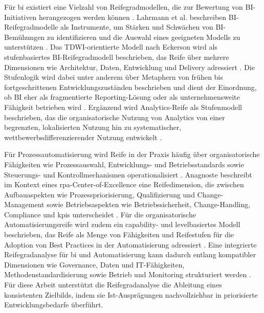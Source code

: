 Für \gls{bi} existiert eine Vielzahl von Reifegradmodellen, die zur Bewertung von BI-Initiativen herangezogen werden können \cite{LahrmannEtAl2010BIMMsOverview}. 
Lahrmann et al. beschreiben BI-Reifegradmodelle als Instrumente, um Stärken und Schwächen von BI-Bemühungen zu identifizieren und die Auswahl eines geeigneten Modells zu unterstützen \cite{LahrmannEtAl2010BIMMsOverview}. 
Das TDWI-orientierte Modell nach Eckerson wird als stufenbasiertes BI-Reifegradmodell beschrieben, das Reife über mehrere Dimensionen wie Architektur, Daten, Entwicklung und Delivery adressiert \cite{HribarRajteric2010BIMMsOverview,LahrmannEtAl2010BIMMsOverview}. 
Die Stufenlogik wird dabei unter anderem über Metaphern von frühen bis fortgeschrittenen Entwicklungszuständen beschrieben und dient der Einordnung, ob BI eher als fragmentierte Reporting-Lösung oder als unternehmensweite Fähigkeit betrieben wird \cite{HribarRajteric2010BIMMsOverview}. 
Ergänzend wird Analytics-Reife als Stufenmodell beschrieben, das die organisatorische Nutzung von Analytics von einer begrenzten, lokalisierten Nutzung hin zu systematischer, wettbewerbsdifferenzierender Nutzung entwickelt \cite{DavenportHarris2017CompetingOnAnalytics}. 

Für Prozessautomatisierung wird Reife in der Praxis häufig über organisatorische Fähigkeiten wie Prozessauswahl, Entwicklungs- und Betriebsstandards sowie Steuerungs- und Kontrollmechanismen operationalisiert \cite{Anagnoste2013RPACoE,RoeglingerPoeppelbuSS2011}. 
Anagnoste beschreibt im Kontext eines \gls{rpa}-Center-of-Excellence eine Reifedimension, die zwischen Aufbauaspekten wie Prozesspriorisierung, Qualifizierung und Change-Management sowie Betriebsaspekten wie Betriebssicherheit, Change-Handling, Compliance und \glspl{kpi} unterscheidet \cite{Anagnoste2013RPACoE}. 
Für die organisatorische Automatisierungsreife wird zudem ein capability- und levelbasiertes Modell beschrieben, das Reife als Menge von Fähigkeiten und Reifestufen für die Adoption von Best Practices in der Automatisierung adressiert \cite{Microsoft2022AutomationMaturityModel}. 
Eine integrierte Reifegradanalyse für \gls{bi} und Automatisierung kann dadurch entlang kompatibler Dimensionen wie Governance, Daten und IT-Fähigkeiten, Methodenstandardisierung sowie Betrieb und Monitoring strukturiert werden \cite{RoeglingerPoeppelbuSS2011,LahrmannEtAl2010BIMMsOverview,Anagnoste2013RPACoE}. 
Für diese Arbeit unterstützt die Reifegradanalyse die Ableitung eines konsistenten Zielbilds, indem sie Ist-Ausprägungen nachvollziehbar in priorisierte Entwicklungsbedarfe überführt.


